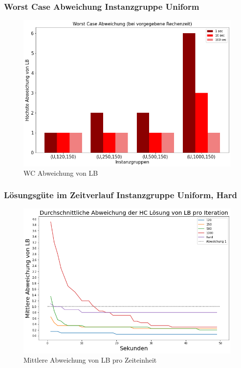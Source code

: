 \documentclass{beamer}
\begin{document}
\begin{frame}

\frametitle{Worst Case Abweichung Instanzgruppe Uniform}

\begin{figure}[!htbp]
\begin{center}
\includegraphics[scale=0.3]{img/wc_unif.png}
\end{center}
\caption{WC Abweichung von LB}
\label{fig:WC}
\end{figure}



\end{frame}
\begin{frame}

\frametitle{Lösungsgüte im Zeitverlauf Instanzgruppe Uniform, Hard }

\begin{figure}[!htbp]
\begin{center}
\includegraphics[scale=0.3]{img/uniform_time.png}
\end{center}
\caption{Mittlere Abweichung von LB pro Zeiteinheit}
\label{fig:architecture}
\end{figure}

\end{frame}
\end{document}
